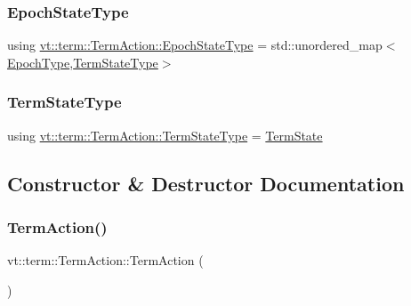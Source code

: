\mbox{\label{structvt_1_1term_1_1_term_action_afcbc07a9b40ff2b6d53e9522877a745d}} 
\subsubsection{\texorpdfstring{Epoch\+State\+Type}{EpochStateType}}
{\footnotesize\ttfamily using \hyperlink{structvt_1_1term_1_1_term_action_afcbc07a9b40ff2b6d53e9522877a745d}{vt\+::term\+::\+Term\+Action\+::\+Epoch\+State\+Type} =  std\+::unordered\+\_\+map$<$\hyperlink{namespacevt_a81d11b28122d43bf9834577e4a06440f}{Epoch\+Type},\hyperlink{structvt_1_1term_1_1_term_action_ae4c635b69751d887666814700ed64d65}{Term\+State\+Type}$>$}

\mbox{\label{structvt_1_1term_1_1_term_action_ae4c635b69751d887666814700ed64d65}} 
\subsubsection{\texorpdfstring{Term\+State\+Type}{TermStateType}}
{\footnotesize\ttfamily using \hyperlink{structvt_1_1term_1_1_term_action_ae4c635b69751d887666814700ed64d65}{vt\+::term\+::\+Term\+Action\+::\+Term\+State\+Type} =  \hyperlink{structvt_1_1term_1_1_term_state}{Term\+State}}



\subsection{Constructor \& Destructor Documentation}
\mbox{\label{structvt_1_1term_1_1_term_action_ac0b0f4271452cfbea674c6a7c4f50a4b}} 
\subsubsection{\texorpdfstring{Term\+Action()}{TermAction()}}
{\footnotesize\ttfamily vt\+::term\+::\+Term\+Action\+::\+Term\+Action (\begin{DoxyParamCaption}{ }\end{DoxyParamCaption})\hspace{0.3cm}{\ttfamily [default]}}



